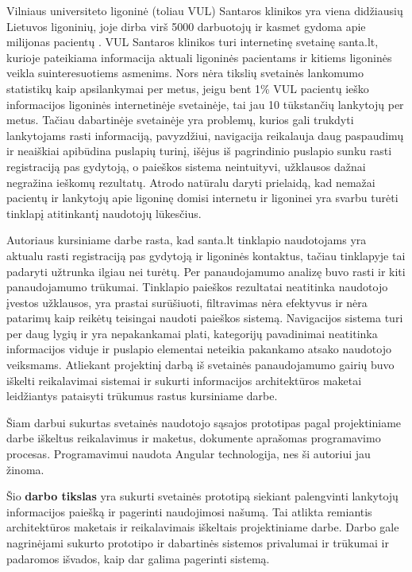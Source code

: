 \documentclass{VUMIFPSbakalaurinis}
\begin{document}
Vilniaus universiteto ligoninė (toliau VUL) Santaros klinikos yra viena didžiausių Lietuvos ligoninių, joje dirba virš 5000 darbuotojų ir kasmet gydoma apie milijonas pacientų \cite{VulSkApieMusLt}. VUL Santaros klinikos turi internetinę svetainę santa.lt, kurioje pateikiama informacija aktuali ligoninės pacientams ir kitiems ligoninės veikla suinteresuotiems asmenims. Nors nėra tikslių svetainės lankomumo statistikų kaip apsilankymai per metus, jeigu bent 1\% VUL pacientų ieško informacijos ligoninės internetinėje svetainėje, tai jau 10 tūkstančių lankytojų per metus. Tačiau dabartinėje svetainėje yra problemų, kurios gali trukdyti lankytojams rasti informaciją, pavyzdžiui, navigacija reikalauja daug paspaudimų ir neaiškiai apibūdina puslapių turinį, išėjus iš pagrindinio puslapio sunku rasti registraciją pas gydytoją, o paieškos sistema neintuityvi, užklausos dažnai negražina ieškomų rezultatų. Atrodo natūralu daryti prielaidą, kad nemažai pacientų ir lankytojų apie ligoninę domisi internetu ir ligoninei yra svarbu turėti tinklapį atitinkantį naudotojų lūkesčius.

\pagebreak
Autoriaus kursiniame darbe rasta, kad santa.lt tinklapio naudotojams yra aktualu rasti registraciją pas gydytoją ir ligoninės kontaktus, tačiau tinklapyje tai padaryti užtrunka ilgiau nei turėtų. Per panaudojamumo analizę buvo rasti ir kiti panaudojamumo trūkumai. Tinklapio paieškos rezultatai neatitinka naudotojo įvestos užklausos, yra prastai surūšiuoti, filtravimas nėra efektyvus ir nėra patarimų kaip reikėtų teisingai naudoti paieškos sistemą. Navigacijos sistema turi per daug lygių ir yra nepakankamai plati, kategorijų pavadinimai neatitinka informacijos viduje ir puslapio elementai neteikia pakankamo atsako naudotojo veiksmams. Atliekant projektinį darbą iš svetainės panaudojamumo gairių buvo iškelti reikalavimai sistemai ir sukurti informacijos architektūros maketai leidžiantys pataisyti trūkumus rastus kursiniame darbe.

Šiam darbui sukurtas svetainės naudotojo sąsajos prototipas pagal projektiniame darbe iškeltus reikalavimus ir maketus, dokumente aprašomas programavimo procesas. Programavimui naudota Angular technologija, nes ši autoriui jau žinoma.

Šio \textbf{darbo tikslas} yra sukurti svetainės prototipą siekiant palengvinti lankytojų informacijos paiešką ir pagerinti naudojimosi našumą. Tai atlikta remiantis architektūros maketais ir reikalavimais iškeltais projektiniame darbe. Darbo gale nagrinėjami sukurto prototipo ir dabartinės sistemos privalumai ir trūkumai ir padaromos išvados, kaip dar galima pagerinti sistemą.
\end{document}
